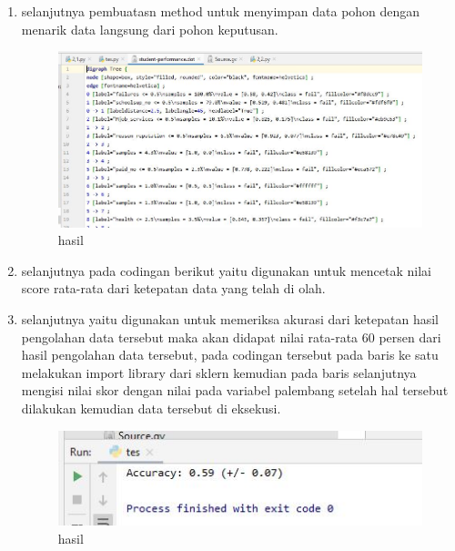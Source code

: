 \begin{enumerate}
\item selanjutnya pembuatasn method untuk menyimpan data pohon dengan menarik data langsung dari pohon keputusan.

\begin{figure}[ht]
\centering
\includegraphics[scale=0.5]{figures/1174042/chapter2/2,7.JPG}
\caption{hasil}
\label{contoh}
\end{figure}

\item selanjutnya pada codingan berikut yaitu digunakan untuk mencetak nilai score rata-rata dari ketepatan data yang telah di olah.


\item selanjutnya yaitu digunakan untuk memeriksa akurasi dari ketepatan hasil pengolahan data tersebut maka akan didapat nilai rata-rata 60 persen dari hasil pengolahan data tersebut, pada codingan tersebut pada baris ke satu melakukan import library dari sklern kemudian pada baris selanjutnya mengisi nilai skor dengan nilai pada variabel palembang setelah hal tersebut dilakukan kemudian data tersebut di eksekusi.

\begin{figure}[ht]
\centering
\includegraphics[scale=0.5]{figures/1174042/chapter2/2,9.JPG}
\caption{hasil}
\label{contoh}
\end{figure}


\end{enumerate}

